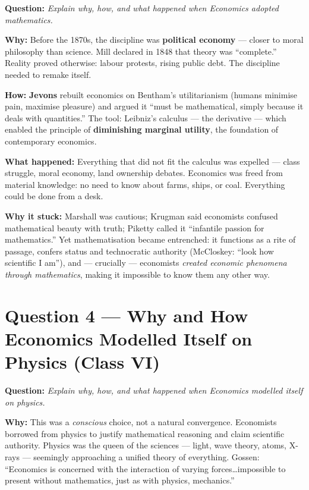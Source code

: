 \documentclass[a4paper,12pt]{article}
\begin{document}
\textbf{Question:} \textit{Explain why, how, and what happened when Economics adopted mathematics.}

\textbf{Why:} Before the 1870s, the discipline was \textbf{political economy} --- closer to moral philosophy than science. Mill declared in 1848 that theory was ``complete.'' Reality proved otherwise: labour protests, rising public debt. The discipline needed to remake itself.

\textbf{How:} \textbf{Jevons} rebuilt economics on Bentham's utilitarianism (humans minimise pain, maximise pleasure) and argued it ``must be mathematical, simply because it deals with quantities.'' The tool: Leibniz's calculus --- the derivative --- which enabled the principle of \textbf{diminishing marginal utility}, the foundation of contemporary economics.

\textbf{What happened:} Everything that did not fit the calculus was expelled --- class struggle, moral economy, land ownership debates. Economics was freed from material knowledge: no need to know about farms, ships, or coal. Everything could be done from a desk.

\textbf{Why it stuck:} Marshall was cautious; Krugman said economists confused mathematical beauty with truth; Piketty called it ``infantile passion for mathematics.'' Yet mathematisation became entrenched: it functions as a rite of passage, confers status and technocratic authority (McCloskey: ``look how scientific I am''), and --- crucially --- economists \textit{created economic phenomena through mathematics}, making it impossible to know them any other way.

\vspace{1.5em}

\section{Question 4 — Why and How Economics Modelled Itself on Physics (Class VI)}

\textbf{Question:} \textit{Explain why, how, and what happened when Economics modelled itself on physics.}

\textbf{Why:} This was a \textit{conscious} choice, not a natural convergence. Economists borrowed from physics to justify mathematical reasoning and claim scientific authority. Physics was the queen of the sciences --- light, wave theory, atoms, X-rays --- seemingly approaching a unified theory of everything. Gossen: ``Economics is concerned with the interaction of varying forces\ldots impossible to present without mathematics, just as with physics, mechanics.''
\end{document}
